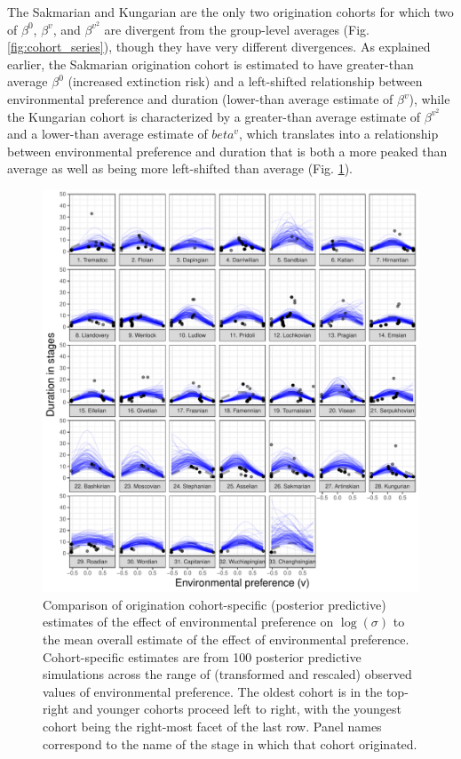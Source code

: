 \documentclass[11pt]{article}
\begin{document}
The Sakmarian and Kungarian are the only two origination cohorts for which two of \(\beta^{0}\), \(\beta^{v}\), and \(\beta^{v^{2}}\) are divergent from the group-level averages (Fig. \ref{fig:cohort_series}), though they have very different divergences. As explained earlier, the Sakmarian origination cohort is estimated to have greater-than average \(\beta^{0}\) (increased extinction risk) and a left-shifted relationship between environmental preference and duration (lower-than average estimate of \(\beta^{v}\)), while the Kungarian cohort is characterized by a greater-than average estimate of \(\beta^{v^{2}}\) and a lower-than average estimate of \(beta^{v}\), which translates into a relationship between environmental preference and duration that is both a more peaked than average as well as being more left-shifted than average (Fig. \ref{fig:env_cohort}).

\begin{figure}[ht]
  \centering
  \includegraphics[width = \textwidth,height = 0.8\textheight,keepaspectratio=true]{figure/env_cohort_med_cweib_cens}
  \caption{Comparison of origination cohort-specific (posterior predictive) estimates of the effect of environmental preference on \(\log(\sigma)\) to the mean overall estimate of the effect of environmental preference. Cohort-specific estimates are from 100 posterior predictive simulations across the range of (transformed and rescaled) observed values of environmental preference. The oldest cohort is in the top-right and younger cohorts proceed left to right, with the youngest cohort being the right-most facet of the last row. Panel names correspond to the name of the stage in which that cohort originated.}
  \label{fig:env_cohort}
\end{figure}
\end{document}
